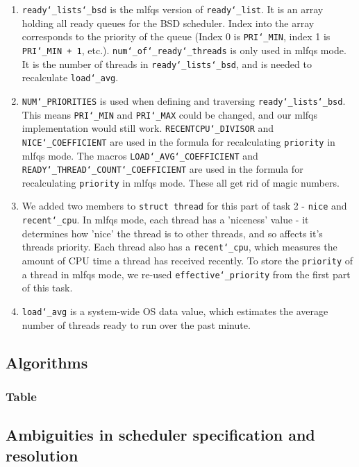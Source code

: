 \documentclass{article}
\renewcommand{\_}{\char`_}
\begin{document}
\begin{enumerate}

\item \texttt{ready\_lists\_bsd} is the mlfqs version of \texttt{ready\_list}. It is an array holding all ready queues for the BSD scheduler. Index into the array corresponds to the priority of the queue (Index 0 is \texttt{PRI\_MIN}, index 1 is \texttt{PRI\_MIN + 1}, etc.). \texttt{num\_of\_ready\_threads} is only used in mlfqs mode. It is the number of threads in \texttt{ready\_lists\_bsd}, and is needed to recalculate \texttt{load\_avg}.

\item \texttt{NUM\_PRIORITIES} is used when defining and traversing \texttt{ready\_lists\_bsd}. This means \texttt{PRI\_MIN} and \texttt{PRI\_MAX} could be changed, and our mlfqs implementation would still work. \texttt{RECENTCPU\_DIVISOR} and \texttt{NICE\_COEFFICIENT} are used in the formula for recalculating \texttt{priority} in mlfqs mode. The macros \texttt{LOAD\_AVG\_COEFFICIENT} and \texttt{READY\_THREAD\_COUNT\_COEFFICIENT} are used in the formula for recalculating \texttt{priority} in mlfqs mode. These all get rid of magic numbers.

\item We added two members to \texttt{struct thread} for this part of task 2 - \texttt{nice} and \texttt{recent\_cpu}. In mlfqs mode, each thread has a 'niceness' value - it determines how 'nice' the thread is to other threads, and so affects it's threads priority. Each thread also has a \texttt{recent\_cpu}, which measures the amount of CPU time a thread has received recently. To store the \texttt{priority} of a thread in mlfqs mode, we re-used \texttt{effective\_priority} from the first part of this task.

\item \texttt{load\_avg} is a system-wide OS data value, which estimates the average number of threads ready to run over the past minute.

\end{enumerate}

\subsection{Algorithms}
\subsubsection{Table}
\subsection{Ambiguities in scheduler specification and resolution}
\end{document}
